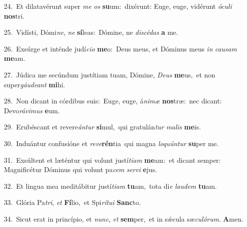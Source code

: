 {\numbfont\textcolor{\numbcolor}{24.}}~Et dilatavérunt super \textit{me} \textit{os} \textbf{su}\-um:~\star dixérunt: Euge, euge, vidérunt \textit{ó}\-\textit{cu}\textit{li} \textbf{nos}\-tri.\par
{\numbfont\textcolor{\numbcolor}{25.}}~Vidísti, Dómi\-\textit{ne}\-, \textit{ne} \textbf{sí}\-leas:~\star Dómine, ne \textit{di}\-\textit{scé}\textit{das} \textbf{a} me.\par
{\numbfont\textcolor{\numbcolor}{26.}}~Exsúrge et inténde judí\-\textit{ci}\-\textit{o} \textbf{me}\-o:~\star Deus meus, et Dóminus meus \textit{in} \textit{cau}\-\textit{sam} \textbf{me}\-am.\par
{\numbfont\textcolor{\numbcolor}{27.}}~Júdica me secúndum justítiam tuam, Dómine, \textit{De}\-\textit{us} \textbf{me}\-us,~\star et non super\-\textit{gáu}\-\textit{de}\textit{ant} \textbf{mi}\-hi.\par
{\numbfont\textcolor{\numbcolor}{28.}}~Non dicant in córdibus suis:~\dagger Euge, euge, á\-\textit{ni}\-\textit{mæ} \textbf{nos}\-træ:~\star nec dicant: Devo\-\textit{rá}\-\textit{vi}\textit{mus} \textbf{e}\-um.\par
{\numbfont\textcolor{\numbcolor}{29.}}~Erubéscant et revere\-\textit{án}\-\textit{tur} \textbf{si}\-mul,~\star qui gratulán\textit{tur} \textit{ma}\-\textit{lis} \textbf{me}\-is.\par
{\numbfont\textcolor{\numbcolor}{30.}}~Induántur confusióne et \textit{re}\-\textit{ve}\textbf{rén}tia~\star qui magna \textit{lo}\-\textit{quún}\textit{tur} \textbf{su}\-per me.\par
{\numbfont\textcolor{\numbcolor}{31.}}~Exsúltent et læténtur qui volunt justí\-\textit{ti}\-\textit{am} \textbf{me}\-am:~\star et dicant semper: Magnificétur Dóminus qui volunt pa\textit{cem} \textit{ser}\-\textit{vi} \textbf{e}\-jus.\par
{\numbfont\textcolor{\numbcolor}{32.}}~Et lingua mea meditábitur justí\-\textit{ti}\-\textit{am} \textbf{tu}\-am,~\star tota di\textit{e} \textit{lau}\-\textit{dem} \textbf{tu}\-am.\par
{\numbfont\textcolor{\numbcolor}{33.}}~Glória Pa\-\textit{tri}\-, \textit{et} \textbf{Fí}\-lio,~\star et Spi\-\textit{rí}\-\textit{tu}\textit{i} \textbf{Sanc}\-to.\par
{\numbfont\textcolor{\numbcolor}{34.}}~Sicut erat in princípio, et \textit{nunc}\-, \textit{et} \textbf{sem}\-per,~\star et in sǽcula sæ\-\textit{cu}\-\textit{ló}\textit{rum}. \textbf{A}\-men.\par

